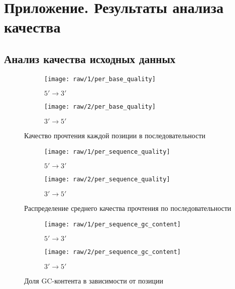 \documentclass[main.tex]{subfiles}
\begin{document}
\section{Приложение. Результаты анализа качества}

\subsection{Анализ качества исходных данных}

\begin{figure}[H]
    \centering
    \begin{subfigure}{.5\textwidth}
        \centering
        \texttt{[image: raw/1/per\_base\_quality]}
        \caption{$ 5' \to 3' $}
    \end{subfigure}%
    \begin{subfigure}{.5\textwidth}
        \centering
        \texttt{[image: raw/2/per\_base\_quality]}
        \caption{$ 3' \to 5' $}
    \end{subfigure}
\caption{Качество прочтения каждой позиции в последовательности}
\label{fig:raw:per_base_q}
\end{figure}

\begin{figure}[H]
    \centering
    \begin{subfigure}{.5\textwidth}
        \centering
        \texttt{[image: raw/1/per\_sequence\_quality]}
        \caption{$ 5' \to 3' $}
    \end{subfigure}%
    \begin{subfigure}{.5\textwidth}
        \centering
        \texttt{[image: raw/2/per\_sequence\_quality]}
        \caption{$ 3' \to 5' $}
    \end{subfigure}
    \caption{Распределение среднего качества прочтения по последовательности}
    \label{fig:raw:across_reads_q}
\end{figure}

\begin{figure}[H]
    \centering
    \begin{subfigure}{.5\textwidth}
        \centering
        \texttt{[image: raw/1/per\_sequence\_gc\_content]}
        \caption{$ 5' \to 3' $}
    \end{subfigure}%
    \begin{subfigure}{.5\textwidth}
        \centering
        \texttt{[image: raw/2/per\_sequence\_gc\_content]}
        \caption{$ 3' \to 5' $}
    \end{subfigure}
    \caption{Доля GC-контента в зависимости от позиции}
    \label{fig:raw:gc}
\end{figure}
\end{document}
